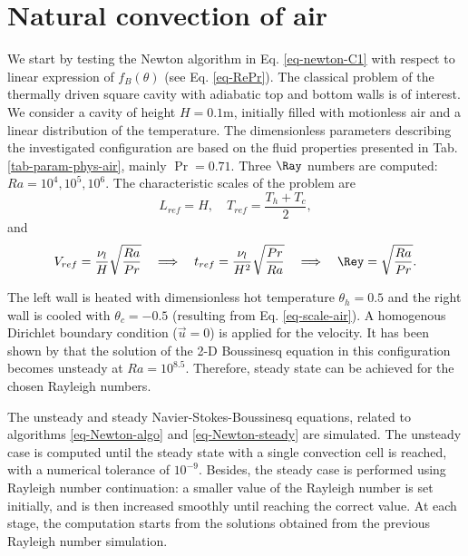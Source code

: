 \section{Natural convection of air}\label{sec: natconv-air-2D}
We start by testing the Newton algorithm in Eq. \ref{eq-newton-C1} with respect to linear expression of $f_B(\theta)$  (see Eq. \ref{eq-RePr}). %
The classical problem of the thermally driven square cavity with adiabatic top and bottom walls is of interest.
We consider a cavity of height $H = 0.1$m, initially filled with motionless air and a linear distribution of the temperature. 
The dimensionless parameters describing the investigated configuration are based on the fluid properties presented in Tab. \ref{tab-param-phys-air}, mainly $\Pr = 0.71$.
Three $\Ray$ numbers are computed: $Ra = 10^4, 10^5, 10^6$. 
The characteristic scales of the problem are 
\begin{equation} \label{eq-scale-air}
	L_{ref} = H, \quad T_{ref} = \frac{T_h + T_c}{2},
\end{equation}
and
\begin{equation} \label{eq-scaling-3}
   V_{ref} = \frac{\nu_l}{H} \sqrt{\frac{Ra}{Pr}} 
   \quad \Longrightarrow \quad t_{ref} = \frac{\nu_l}{H^2} \sqrt{\frac{Pr}{Ra}} 
   \quad \Longrightarrow \quad \Rey = \sqrt{\frac{Ra}{Pr}}.
\end{equation} 

\noindent The left wall is heated with dimensionless hot temperature $\theta_h = 0.5$ and the right wall is cooled with $\theta_c = -0.5$ (resulting from Eq. \ref{eq-scale-air}). 
A homogenous Dirichlet boundary condition ($\vec u = 0$) is applied for the velocity.
It has been shown by \cite{LeQuere91} that the solution of the 2-D Boussinesq equation in this configuration becomes unsteady at $Ra = 10^{8.5}$.
Therefore, steady state can be achieved for the chosen Rayleigh numbers.

The unsteady  and steady Navier-Stokes-Boussinesq equations, related to algorithms \ref{eq-Newton-algo} and \ref{eq-Newton-steady} are simulated.
The unsteady case is computed until the steady state with a single convection cell is reached, with a numerical tolerance of $10^{-9}$.
Besides, the steady case is performed using Rayleigh number continuation:
a smaller value of the Rayleigh number is set initially, and is then increased smoothly until reaching the correct value.
At each stage, the computation starts from the solutions obtained from the previous Rayleigh number simulation.


